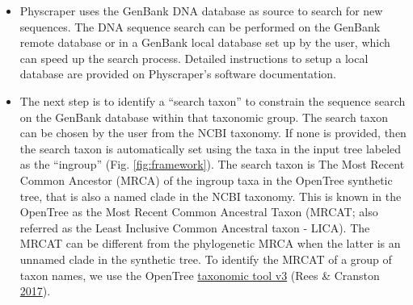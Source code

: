 \documentclass[]{article}
\begin{document}
\begin{itemize}
\item
  Physcraper uses the GenBank DNA database as source to search for new sequences. The DNA sequence search can be performed on the GenBank remote database or in a GenBank local database set up by the user, which can speed up the search process. Detailed instructions to setup a local database are provided on Physcraper's software documentation.
\item
  The next step is to identify a ``search taxon'' to constrain the sequence search on the GenBank database within that taxonomic group.
  The search taxon can be chosen by the user from the NCBI taxonomy.
  If none is provided, then the search taxon is automatically set using the taxa in the input tree labeled as the ``ingroup'' (Fig. \ref{fig:framework}).
  The search taxon is The Most Recent Common Ancestor (MRCA) of the ingroup taxa in the OpenTree synthetic tree, that is also a named clade in the NCBI taxonomy.
  This is known in the OpenTree as the Most Recent Common
  Ancestral Taxon (MRCAT; also referred as the Least Inclusive Common Ancestral taxon - LICA).
  The MRCAT can be different from the phylogenetic MRCA when the latter is an unnamed clade in the synthetic tree.
  To identify the MRCAT of a group of taxon names, we use the OpenTree \href{https://github.com/OpenTreeOfLife/germinator/wiki/Taxonomy-API-v3\#mrca}{taxonomic tool v3} (Rees \& Cranston \protect\hyperlink{ref-rees2017automated}{2017}).


\end{itemize}
\end{document}
